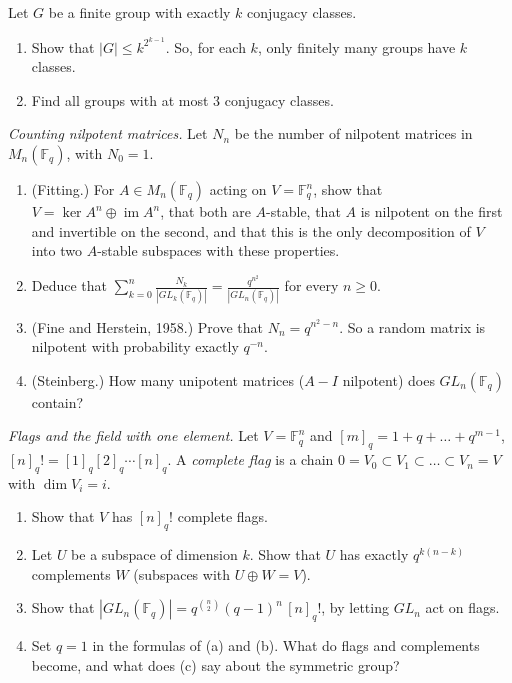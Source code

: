 \begin{exercise}[$\star\star$]\label{pb:landau}
Let $G$ be a finite group with exactly $k$ conjugacy classes.
\begin{enumerate}[label=(\alph*)]
\item Show that $|G|\le k^{2^{k-1}}$. So, for each $k$, only finitely many groups have $k$ classes.
\item Find all groups with at most $3$ conjugacy classes.
\end{enumerate}
\end{exercise}

\begin{exercise}[$\star\star\star$]\label{pb:nilpotent}
\emph{Counting nilpotent matrices.} Let $N_n$ be the number of nilpotent matrices in $M_n(\mathbb F_q)$, with $N_0=1$.
\begin{enumerate}[label=(\alph*)]
\item (Fitting.) For $A\in M_n(\mathbb F_q)$ acting on $V=\mathbb F_q^n$, show that $V=\ker A^n\oplus\operatorname{im}A^n$,
that both are $A$-stable, that $A$ is nilpotent on the first and invertible on the second, and that this is the only
decomposition of $V$ into two $A$-stable subspaces with these properties.
\item Deduce that $\displaystyle\sum_{k=0}^n\frac{N_k}{|GL_k(\mathbb F_q)|}=\frac{q^{n^2}}{|GL_n(\mathbb F_q)|}$ for every $n\ge0$.
\item (Fine and Herstein, 1958.) Prove that $N_n=q^{n^2-n}$. So a random matrix is nilpotent with probability exactly $q^{-n}$.
\item (Steinberg.) How many unipotent matrices ($A-I$ nilpotent) does $GL_n(\mathbb F_q)$ contain?
\end{enumerate}
\end{exercise}

\begin{exercise}[$\star$]\label{pb:flags}
\emph{Flags and the field with one element.} Let $V=\mathbb F_q^n$ and $[m]_q=1+q+\dots+q^{m-1}$, $[n]_q!=[1]_q[2]_q\cdots[n]_q$.
A \emph{complete flag} is a chain $0=V_0\subset V_1\subset\dots\subset V_n=V$ with $\dim V_i=i$.
\begin{enumerate}[label=(\alph*)]
\item Show that $V$ has $[n]_q!$ complete flags.
\item Let $U$ be a subspace of dimension $k$. Show that $U$ has exactly $q^{k(n-k)}$ complements $W$ (subspaces with $U\oplus W=V$).
\item Show that $|GL_n(\mathbb F_q)|=q^{\binom n2}(q-1)^n\,[n]_q!$, by letting $GL_n$ act on flags.
\item Set $q=1$ in the formulas of (a) and (b). What do flags and complements become, and what does (c) say about the
symmetric group?
\end{enumerate}
\end{exercise}

